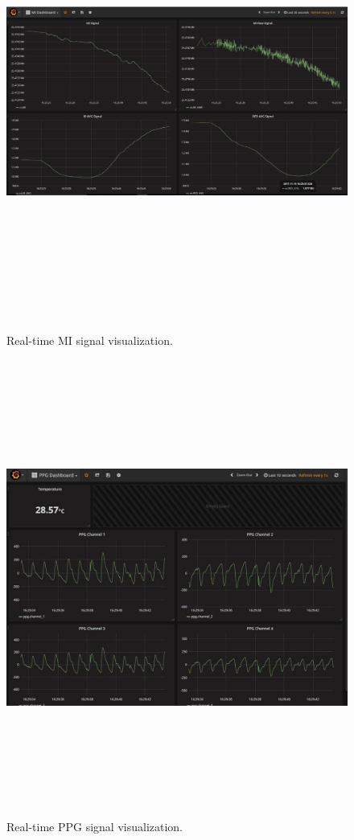\begin{figure}[htpb]
	\centering
	\includegraphics[width=16cm,height=15cm,keepaspectratio=true]{images/mi_dsh}
	\caption{
		Real-time MI signal visualization.
	}
	\label{fig:mi_dsh}
\end{figure}

\begin{figure}[htpb]
	\centering
	\includegraphics[width=16cm,height=15cm,keepaspectratio=true]{images/ppg_dsh}
	\caption{
		Real-time PPG signal visualization.
	}
	\label{fig:ppg_dsh}
\end{figure}


